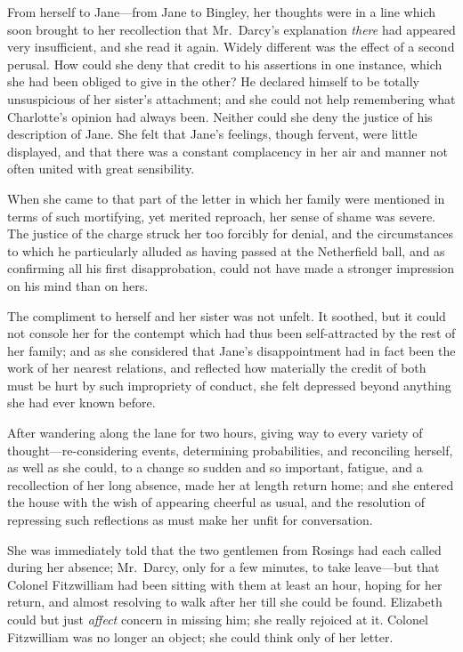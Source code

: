 \documentclass[12pt,english,oneside]{book}
\begin{document}
From herself to Jane\mbox{---}from Jane to Bingley, her thoughts
were in a line which soon brought to her recollection that Mr.\ Darcy's
explanation \textit{there} had appeared very insufficient, and she
read it again. Widely different was the effect of a second perusal.
How could she deny that credit to his assertions in one instance,
which she had been obliged to give in the other? He declared himself
to be totally unsuspicious of her sister's attachment; and she could
not help remembering what Charlotte's opinion had always been. Neither
could she deny the justice of his description of Jane. She felt that
Jane's feelings, though fervent, were little displayed, and that there
was a constant complacency in her air and manner not often united
with great sensibility.

When she came to that part of the letter in which her family were
mentioned in terms of such mortifying, yet merited reproach, her sense
of shame was severe. The justice of the charge struck her too forcibly
for denial, and the circumstances to which he particularly alluded
as having passed at the Netherfield ball, and as confirming all his
first disapprobation, could not have made a stronger impression on
his mind than on hers.

The compliment to herself and her sister was not unfelt. It soothed,
but it could not console her for the contempt which had thus been
self-attracted by the rest of her family; and as she considered that
Jane's disappointment had in fact been the work of her nearest relations,
and reflected how materially the credit of both must be hurt by such
impropriety of conduct, she felt depressed beyond anything she had
ever known before.

After wandering along the lane for two hours, giving way to every
variety of thought\mbox{---}re-considering events, determining probabilities,
and reconciling herself, as well as she could, to a change so sudden
and so important, fatigue, and a recollection of her long absence,
made her at length return home; and she entered the house with the
wish of appearing cheerful as usual, and the resolution of repressing
such reflections as must make her unfit for conversation.

She was immediately told that the two gentlemen from Rosings had each
called during her absence; Mr.\ Darcy, only for a few minutes, to
take leave\mbox{---}but that Colonel Fitzwilliam had been sitting
with them at least an hour, hoping for her return, and almost resolving
to walk after her till she could be found. Elizabeth could but just
\textit{affect} concern in missing him; she really rejoiced at it.
Colonel Fitzwilliam was no longer an object; she could think only
of her letter.
\end{document}
